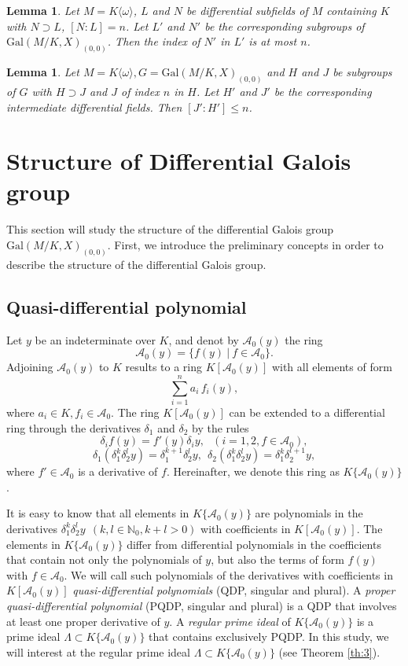 \documentclass[preprint, 12pt]{elsarticle}
\newtheorem{lem}[thm]{Lemma}
\numberwithin{equation}{section}
\newcommand{\A}{\mathcal{A}}
\newcommand{\Gal}{\mathrm{Gal}}
\newcommand{\KA}{K\{\A_0(y)\}}
\begin{document}
\begin{lem}
\label{le:20}\cite[Lemma 3.1]{Ka:76} Let $M =
K\langle\omega\rangle$, $L$ and $N$ be differential subfields of
$M$ containing $K$ with $N\supset L$, $[N:L] = n$. Let $L'$ and
$N'$ be the corresponding subgroups of $\Gal(M/K,X)_{(0,0)}$. Then
the index of $N'$ in $L'$ is at most $n$.
\end{lem}
\begin{lem}
\label{le:28}\cite[Lemma 3.2]{Ka:76} Let $M =
K\langle\omega\rangle, G=\Gal(M/K,X)_{(0,0)}$ and $H$ and $J$ be
subgroups of $G$ with $H\supset J$ and $J$ of index $n$ in $H$.
Let $H'$ and $J'$ be the corresponding intermediate differential
fields. Then $[J':H']\leq n$.
\end{lem}

\section{Structure of Differential Galois group}
\label{sec:3} 
This section will study the structure of
the differential Galois group $\Gal(M/K,X)_{(0,0)}$. First, we
introduce the preliminary concepts in order to 
describe the structure of the differential Galois group.

\subsection{Quasi-differential polynomial} 
\label{sec:2.2}

Let $y$ be an indeterminate over $K$, and denot by $\A_0(y)$ the
ring
$$\A_0(y) = \{f(y)\ |\ f\in \A_0\}.$$
Adjoining $\A_0(y)$ to $K$ results to a ring $K[\A_0(y)]$ with all
elements of form
$$\sum_{i = 1}^n a_i\,f_i(y),$$
where $a_i\in K, f_i\in \A_0$. The ring $K[\A_0(y)]$
can be extended to a differential ring through the derivatives $\delta_1$ and $\delta_2$
by the rules
$$\delta_i f(y) = f'(y) \delta_iy, \ \ \ (i = 1, 2, f\in \A_0),$$
$$\delta_1(\delta_1^k\delta_2^l y) = \delta_1^{k + 1}\delta_2^l
y,\ \  \delta_2(\delta_1^k\delta_2^l y) = \delta_1^k\delta_2^{l +
1} y ,$$ where $f'\in \A_0$ is a derivative of $f$. Hereinafter, we denote this ring as
$K\{\A_0(y)\}$. 

It is easy to know that all elements in $\KA$ are
polynomials in the derivatives $\delta_1^k\delta_2^l y\ \ (k,l\in
\mathbb{N}_0, k+l > 0)$ with coefficients in $K[\A_0(y)]$. The elements in
$\KA$ differ from differential polynomials in the coefficients that contain not only the polynomials of $y$, but also the terms of form $f(y)$ with $f\in \A_0$. We will call such polynomials of
the derivatives with coefficients in $K[\A_0(y)]$
\textit{quasi-differential polynomials} (QDP, singular and
plural). A \textit{proper quasi-differential polynomial}
(PQDP, singular and plural) is a QDP that involves at least
one proper derivative of $y$. A \textit{regular prime ideal} of
$K\{\A_0(y)\}$ is a prime ideal $\Lambda\subset K\{\A_0(y)\}$ that
contains exclusively PQDP. In this study, we will interest at the regular prime ideal
$\Lambda \subset K\{\A_0(y)\}$ (see Theorem \ref{th:3}).  
\end{document}

